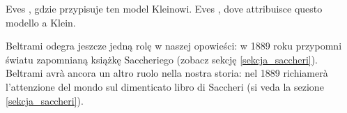 Eves \cite[s. 352, zad. 6--7]{eves1_1972}, gdzie przypisuje ten model Kleinowi. %
Eves \cite[p. 352, es. 6--7]{eves1_1972}, dove attribuisce questo modello a Klein. %

Beltrami odegra jeszcze jedną rolę w naszej opowieści: w 1889 roku przypomni światu zapomnianą książkę Saccheriego (zobacz sekcję \ref{sekcja_saccheri}). %
Beltrami avrà ancora un altro ruolo nella nostra storia: nel 1889 richiamerà l'attenzione del mondo sul dimenticato libro di Saccheri (si veda la sezione \ref{sekcja_saccheri}). %
